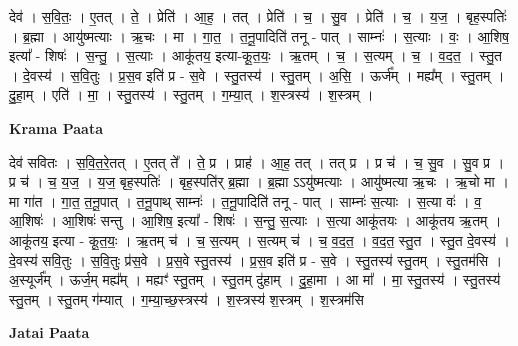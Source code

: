 \documentclass[17pt]{extarticle}
\begin{document}
देव॑ । स॒वि॒तः॒ । ए॒तत् । ते॒ । प्रेति॑ । आ॒ह॒ । तत् । प्रेति॑ । च॒ । सु॒व । प्रेति॑ । च॒ । य॒ज॒ । बृह॒स्पतिः॑ । ब्र॒ह्मा । आयु॑ष्मत्याः । ऋ॒चः । मा । गा॒त॒ । त॒नू॒पादिति॑ तनू - पात् । साम्नः॑ । स॒त्याः । वः॒ । आ॒शिष॒ इत्या᳚ - शिषः॑ । स॒न्तु॒ । स॒त्याः । आकू॑तय॒ इत्या-कू॒त॒यः॒ । ऋ॒तम् । च॒ । स॒त्यम् । च॒ । व॒द॒त॒ । स्तु॒त । दे॒वस्य॑ । स॒वि॒तुः । प्र॒स॒व इति॑ प्र - स॒वे । स्तु॒तस्य॑ । स्तु॒तम् । अ॒सि॒ । ऊर्ज᳚म् । मह्य᳚म् । स्तु॒तम् । दु॒हा॒म् । एति॑ । मा॒ । स्तु॒तस्य॑ । स्तु॒तम् । ग॒म्या॒त् । श॒स्त्रस्य॑ । श॒स्त्रम् ।  \newline


\textbf{Krama Paata} \newline

देव॑ सवितः । स॒वि॒त॒रे॒तत् । ए॒तत् ते᳚ । ते॒ प्र । प्राह॑ । आ॒ह॒ तत् । तत् प्र । प्र च॑ । च॒ सु॒व । सु॒व प्र । प्र च॑ । च॒ य॒ज॒ । य॒ज॒ बृह॒स्पतिः॑ । बृह॒स्पति॑र् ब्र॒ह्मा । ब्र॒ह्मा ऽऽयु॑ष्मत्याः । आयु॑ष्मत्या ऋ॒चः । ऋ॒चो मा । मा गा॑त । गा॒त॒ त॒नू॒पात् । त॒नू॒पाथ् साम्नः॑ । त॒नू॒पादिति॑ तनू - पात् । साम्नः॑ स॒त्याः । स॒त्या वः॑ । व॒ आ॒शिषः॑ । आ॒शिषः॑ सन्तु । आ॒शिष॒ इत्या᳚ - शिषः॑ । स॒न्तु॒ स॒त्याः । स॒त्या आकू॑तयः । आकू॑तय ऋ॒तम् । आकू॑तय॒ इत्या - कू॒त॒यः॒ । ऋ॒तम् च॑ । च॒ स॒त्यम् । स॒त्यम् च॑ । च॒ व॒द॒त॒ । व॒द॒त॒ स्तु॒त । स्तु॒त दे॒वस्य॑ । दे॒वस्य॑ सवि॒तुः । स॒वि॒तुः प्र॑स॒वे । प्र॒स॒वे स्तु॒तस्य॑ । प्र॒स॒व इति॑ प्र - स॒वे । स्तु॒तस्य॑ स्तु॒तम् । स्तु॒तम॑सि । अ॒स्यूर्ज᳚म् । ऊर्ज॒म् मह्य᳚म् । मह्यꣳ॑ स्तु॒तम् । स्तु॒तम् दु॑हाम् । दु॒हा॒मा । आ मा᳚ । मा॒ स्तु॒तस्य॑ । स्तु॒तस्य॑ स्तु॒तम् । स्तु॒तम् ग॑म्यात् । ग॒म्या॒च्छ॒स्त्रस्य॑ । श॒स्त्रस्य॑ श॒स्त्रम् । श॒स्त्रम॑सि \newline

\textbf{Jatai Paata} \newline
\end{document}
